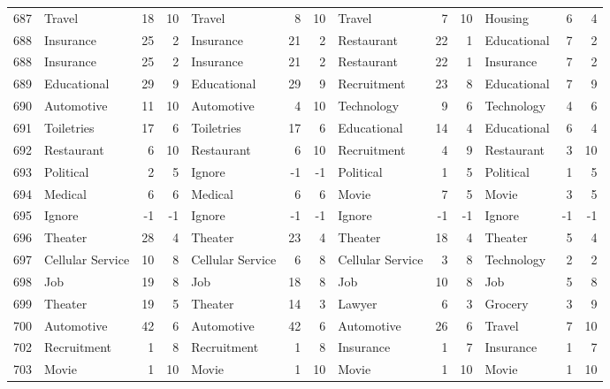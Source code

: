 \begin{figure}[htbp]
\begin{tabular}{rlrrlrrlrrlrr}
    687   & Travel & 18    & 10    & Travel & 8     & 10    & Travel & 7     & 10    & Housing & 6     & 4 \\
    688   & Insurance & 25    & 2     & Insurance & 21    & 2     & Restaurant & 22    & 1     & Educational & 7     & 2 \\
    688   & Insurance & 25    & 2     & Insurance & 21    & 2     & Restaurant & 22    & 1     & Insurance & 7     & 2 \\
    689   & Educational & 29    & 9     & Educational & 29    & 9     & Recruitment & 23    & 8     & Educational & 7     & 9 \\
    690   & Automotive & 11    & 10    & Automotive & 4     & 10    & Technology & 9     & 6     & Technology & 4     & 6 \\
    691   & Toiletries & 17    & 6     & Toiletries & 17    & 6     & Educational & 14    & 4     & Educational & 6     & 4 \\
    692   & Restaurant & 6     & 10    & Restaurant & 6     & 10    & Recruitment & 4     & 9     & Restaurant & 3     & 10 \\
    693   & Political & 2     & 5     & Ignore & -1    & -1    & Political & 1     & 5     & Political & 1     & 5 \\
    694   & Medical & 6     & 6     & Medical & 6     & 6     & Movie & 7     & 5     & Movie & 3     & 5 \\
    695   & Ignore & -1    & -1    & Ignore & -1    & -1    & Ignore & -1    & -1    & Ignore & -1    & -1 \\
    696   & Theater & 28    & 4     & Theater & 23    & 4     & Theater & 18    & 4     & Theater & 5     & 4 \\
    697   & Cellular Service & 10    & 8     & Cellular Service & 6     & 8     & Cellular Service & 3     & 8     & Technology & 2     & 2 \\
    698   & Job   & 19    & 8     & Job   & 18    & 8     & Job   & 10    & 8     & Job   & 5     & 8 \\
    699   & Theater & 19    & 5     & Theater & 14    & 3     & Lawyer & 6     & 3     & Grocery & 3     & 9 \\
    700   & Automotive & 42    & 6     & Automotive & 42    & 6     & Automotive & 26    & 6     & Travel & 7     & 10 \\
    702   & Recruitment & 1     & 8     & Recruitment & 1     & 8     & Insurance & 1     & 7     & Insurance & 1     & 7 \\
    703   & Movie & 1     & 10    & Movie & 1     & 10    & Movie & 1     & 10    & Movie & 1     & 10 \\

\end{tabular}
\end{figure}
